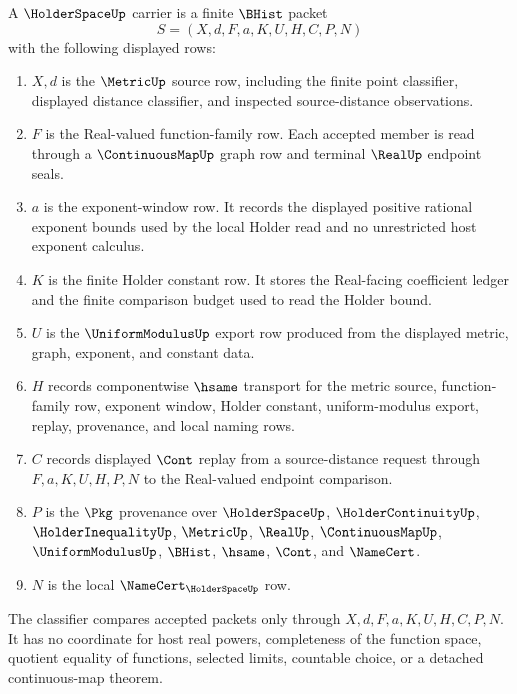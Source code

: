 \begin{definition}
\label{def:holder-space-carrier}
A $\HolderSpaceUp$ carrier is a finite $\BHist$ packet
$$
S=(X,d,F,a,K,U,H,C,P,N)
$$
with the following displayed rows:
\begin{enumerate}
\item $X,d$ is the $\MetricUp$ source row, including the finite point classifier, displayed distance classifier, and inspected source-distance observations.
\item $F$ is the Real-valued function-family row. Each accepted member is read through a $\ContinuousMapUp$ graph row and terminal $\RealUp$ endpoint seals.
\item $a$ is the exponent-window row. It records the displayed positive rational exponent bounds used by the local Holder read and no unrestricted host exponent calculus.
\item $K$ is the finite Holder constant row. It stores the Real-facing coefficient ledger and the finite comparison budget used to read the Holder bound.
\item $U$ is the $\UniformModulusUp$ export row produced from the displayed metric, graph, exponent, and constant data.
\item $H$ records componentwise $\hsame$ transport for the metric source, function-family row, exponent window, Holder constant, uniform-modulus export, replay, provenance, and local naming rows.
\item $C$ records displayed $\Cont$ replay from a source-distance request through $F,a,K,U,H,P,N$ to the Real-valued endpoint comparison.
\item $P$ is the $\Pkg$ provenance over $\HolderSpaceUp$, $\HolderContinuityUp$, $\HolderInequalityUp$, $\MetricUp$, $\RealUp$, $\ContinuousMapUp$, $\UniformModulusUp$, $\BHist$, $\hsame$, $\Cont$, and $\NameCert$.
\item $N$ is the local $\NameCert_{\HolderSpaceUp}$ row.
\end{enumerate}
The classifier compares accepted packets only through $X,d,F,a,K,U,H,C,P,N$. It has no coordinate for host real powers, completeness of the function space, quotient equality of functions, selected limits, countable choice, or a detached continuous-map theorem.
\end{definition}

